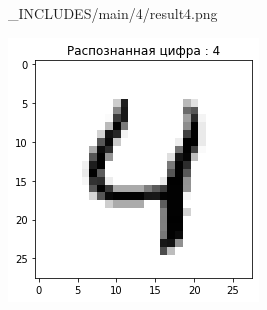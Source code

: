 \begin{figure}[!htp]
\begin{minipage}[h]{0.19\linewidth}
        {_INCLUDES/main/4/result4.png}
    \end{minipage}
    \hfill
    \begin{minipage}[h]{0.19\linewidth}
        \centering
        \includegraphics[width=\linewidth]
        {_INCLUDES/main/4/result5.png}
    \end{minipage}



\end{figure}
